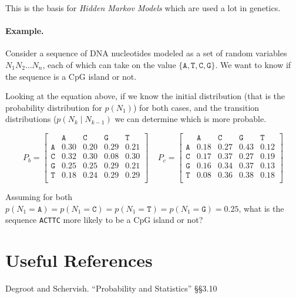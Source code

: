 This is the basis for \emph{Hidden Markov Models} which are used a lot in genetics. 

\paragraph{Example.} 
Consider a sequence of DNA nucleotides modeled as a set of random variables $N_1N_2\hdots N_n$,
each of which can take on the value $\{\texttt{A},\texttt{T},\texttt{C},\texttt{G}\}$. 
We want to know if the sequence is a CpG island or not. 

Looking at the equation above, if we know the initial distribution (that is the probability distribution for $p(N_1)$) for both cases,
and the transition distributions ($p(N_k\mid N_{k-1})$ we can determine which is more probable. 

\[
P_b = 
\begin{bmatrix}
 & \texttt{A} & \texttt{C} & \texttt{G} & \texttt{T}\\
 \texttt{A} & 0.30 & 0.20& 0.29& 0.21\\
 \texttt{C} & 0.32& 0.30& 0.08& 0.30\\
 \texttt{G} & 0.25 & 0.25 & 0.29 & 0.21\\
 \texttt{T} & 0.18 & 0.24 & 0.29 & 0.29\\
\end{bmatrix} \;\;\;\;
P_c = 
\begin{bmatrix}
 & \texttt{A} & \texttt{C} & \texttt{G} & \texttt{T}\\
 \texttt{A} & 0.18 & 0.27 & 0.43 & 0.12\\ 
 \texttt{C} & 0.17 & 0.37 & 0.27 & 0.19\\
 \texttt{G} & 0.16 & 0.34 & 0.37 & 0.13\\
 \texttt{T} & 0.08 & 0.36 & 0.38 & 0.18\\
\end{bmatrix}
\]

Assuming for both $p(N_1=\texttt{A}) = p(N_1=\texttt{C}) = p(N_1=\texttt{T}) = p(N_1=\texttt{G}) = 0.25$, 
what is the sequence \texttt{ACTTC} more likely to be a CpG island or not?


\section*{Useful References}
Degroot and Schervish. ``Probability and Statistics''  \S\S3.10

